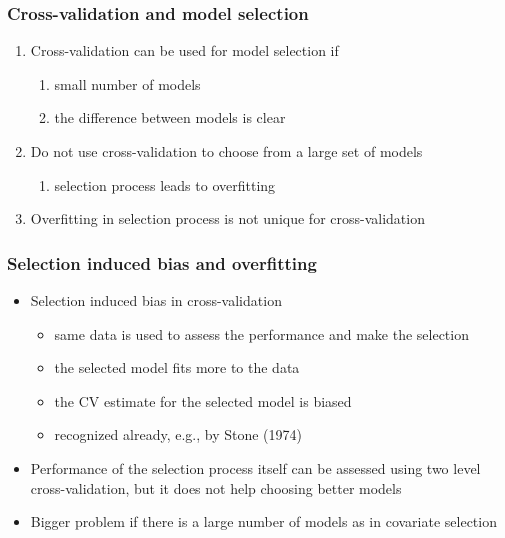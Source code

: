 \documentclass[10pt]{beamer}
\begin{document}
\begin{frame}{}

\frametitle{Cross-validation and model selection}

  \begin{enumerate}
  \item<1-> Cross-validation can be used for model selection if
    \begin{enumerate}
      \item small number of models
      \item the difference between models is clear
    \end{enumerate}
  \item<2-> Do not use cross-validation to choose from a large set of models
    \begin{enumerate}
    \item selection process leads to overfitting
    \end{enumerate}
  \item<3-> Overfitting in selection process is not unique for cross-validation
  \end{enumerate}
\end{frame}

\begin{frame}

\frametitle{Selection induced bias and overfitting}

  \begin{itemize}
  \item Selection induced bias in cross-validation
    \begin{itemize}
    \item same data is used to assess the performance and make the selection
    \item the selected model fits more to the data
    \item the CV estimate for the selected model is biased
    \item recognized already, e.g., by Stone (1974)
    \end{itemize}
    \pause
  \item Performance of the selection process itself can be assessed
    using two level cross-validation, but it does not help choosing
    better models
    \pause
  \item Bigger problem if there is a large number of models as in
    covariate selection
  \end{itemize}

\end{frame}
\end{document}
